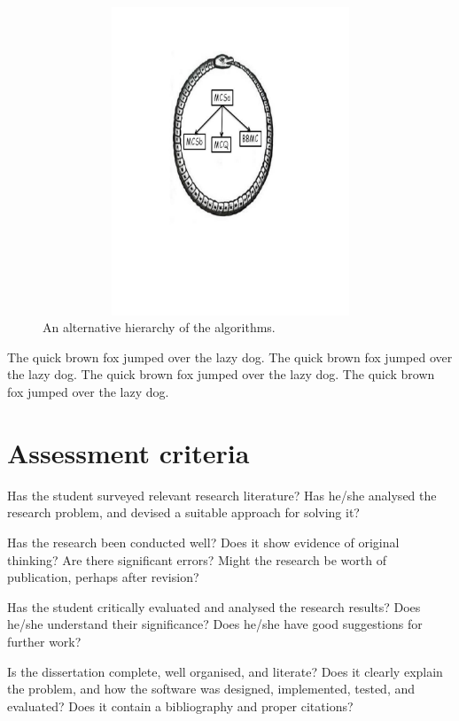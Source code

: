 \documentclass{l4proj}
\theoremstyle{definition}
\begin{document}
\begin{figure}
\centering
\includegraphics[height=9.2cm,width=13.2cm]{uroboros.pdf}
\vspace{-30mm}
\caption{An alternative hierarchy of the algorithms.}
\label{uroborus}
\end{figure}

The quick brown fox jumped over the \cite{ctindex} lazy dog. \cite{rdds}
The quick brown fox jumped over the lazy dog. \cite{freqStructBasedIndexing}
The quick brown fox jumped over \cite{ckt} the lazy dog.
The quick brown fox jumped over \cite{graphX} the lazy dog.


\section{Assessment criteria}
Has the student surveyed relevant
research literature? Has he/she
analysed the research problem, and
devised a suitable approach for solving
it? 

Has the research been conducted well? Does it show evidence of original thinking? Are there significant errors? Might the research be worth of publication, perhaps after revision?

Has the student critically evaluated and analysed the research results? Does
he/she understand their significance? Does he/she have good suggestions for
further work? 

Is the dissertation complete, well organised, and literate? Does it clearly
explain the problem, and how the software was designed, implemented, tested, and evaluated? Does it contain a bibliography and proper citations? 
\end{document}
